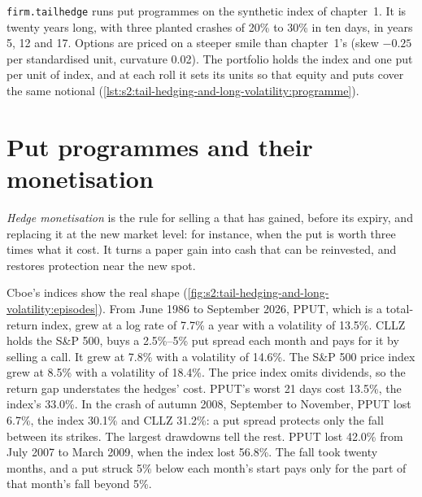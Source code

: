 \texttt{firm.tailhedge} runs put programmes on the synthetic index of chapter~1. It is twenty years long, with three planted crashes of 20\% to 30\%
in ten days, in years 5, 12 and 17. Options are priced on a steeper smile than chapter~1's (skew $-0.25$ per standardised unit, curvature 0.02). The
portfolio holds the index and one put per unit of index, and at each roll it sets its units so that equity and puts cover the same notional
(\cref{lst:s2:tail-hedging-and-long-volatility:programme}).

\section{Put programmes and their monetisation}

\begin{definition}\label{def:s2:tail-hedging-and-long-volatility:monetisation}
\emph{Hedge monetisation} is the rule for selling a  that has gained, before its expiry, and replacing it at the
new market level: for instance, when the put is worth three times what it cost. It turns a paper gain into cash that can be reinvested, and
restores protection near the new spot.
\end{definition}

Cboe's indices show the real shape (\cref{fig:s2:tail-hedging-and-long-volatility:episodes}). From June 1986 to September 2026, PPUT, which is a
total-return index, grew at a log rate of 7.7\% a year with a volatility of 13.5\%. CLLZ holds the S\&P 500, buys a 2.5\%--5\% put spread each month
and pays for it by selling a call. It grew at 7.8\% with a volatility of 14.6\%. The S\&P 500 price index grew at 8.5\% with a volatility of 18.4\%.
The price index omits dividends, so the return gap understates the hedges' cost. PPUT's worst 21 days cost 13.5\%, the index's 33.0\%. In the
crash of autumn 2008, September to November, PPUT lost 6.7\%, the index 30.1\% and CLLZ 31.2\%: a put spread protects only the fall between its
strikes. The largest drawdowns tell the rest. PPUT lost 42.0\% from July 2007 to March 2009, when the index lost 56.8\%. The fall took twenty
months, and a put struck 5\% below each month's start pays only for the part of that month's fall beyond 5\%.

